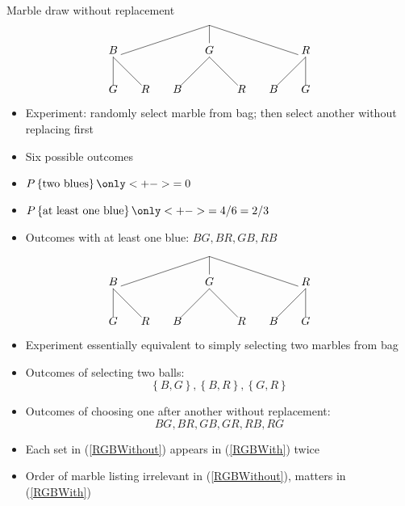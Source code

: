 \documentclass{beamer}
\theoremstyle{definition}
\begin{document}
\begin{frame}{Marble draw without replacement}
\[\begin{xy}<1cm,0cm>:
(0,0)="0";
(-3,-1)="-31";
(0,-1)="01";
(3,-1)="31";
"0";"-31"*+!D{B}**\dir{-};
"0";"01"*+!D{G}**\dir{-};
"0";"31"*+!D{R}**\dir{-};
"-31";(-3,-2)*{G}**\dir{-};
"-31";(-2,-2)*{R}**\dir{-};
"01";(-1,-2)*{B}**\dir{-};
"01";(1,-2)*{R}**\dir{-};
"31";(2,-2)*{B}**\dir{-};
"31";(3,-2)*{G}**\dir{-};
\end{xy}\]
\begin{itemize}
\item Experiment: randomly select marble from bag;
then select another \alert{without replacing} first
\item Six possible outcomes
\item $P\left\{\text{two blues}\right\}
\only<+->{=0}$
\item $P\left\{\text{at least one blue}\right\}
\only<+->{=4/6=2/3}$
\item Outcomes with at least one blue:
$BG,BR,GB,RB$
\end{itemize}
\end{frame}

\begin{frame}
\[\begin{xy}<1cm,0cm>:
(0,0)="0";
(-3,-1)="-31";
(0,-1)="01";
(3,-1)="31";
"0";"-31"*+!D{B}**\dir{-};
"0";"01"*+!D{G}**\dir{-};
"0";"31"*+!D{R}**\dir{-};
"-31";(-3,-2)*{G}**\dir{-};
"-31";(-2,-2)*{R}**\dir{-};
"01";(-1,-2)*{B}**\dir{-};
"01";(1,-2)*{R}**\dir{-};
"31";(2,-2)*{B}**\dir{-};
"31";(3,-2)*{G}**\dir{-};
\end{xy}\]
\begin{itemize}
\item Experiment \alert{essentially} equivalent to simply
selecting two marbles from bag
\item Outcomes of selecting two balls:
\begin{equation}\label{RGBWithout}
\left\{B,G\right\},\left\{B,R\right\},\left\{G,R\right\}
\end{equation}
\item Outcomes of choosing one after another without replacement:
\begin{equation}\label{RGBWith}
BG,BR,GB,GR,RB,RG
\end{equation}
\item Each set in (\ref{RGBWithout}) appears in
(\ref{RGBWith}) \alert{twice}
\item Order of marble listing irrelevant in
(\ref{RGBWithout}), matters in (\ref{RGBWith})
\end{itemize}
\end{frame}
\end{document}
